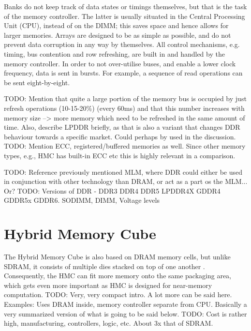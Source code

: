 Banks do not keep track of data states or timings themselves, but that is the task of the memory controller. The latter is usually situated in the Central Processing Unit (CPU), instead of on the DIMM; this saves space and hence allows for larger memories. Arrays are designed to be as simple as possible, and do not prevent data corruption in any way by themselves. All control mechanisms, e.g. timing, bus contention and row refreshing, are built in and handled by the memory controller. In order to not over-utilise buses, and enable a lower clock frequency, data is sent in bursts. For example, a sequence of read operations can be sent eight-by-eight. 

TODO: Mention that quite a large portion of the memory bus is occupied by just refresh operations (10-15-20\%) (every 60ms) and that this number increases with memory size --> more memory which need to be refreshed in the same amount of time. Also, describe LPDDR briefly, as that is also a variant that changes DDR behaviour towards a specific market. Could perhaps by used in the discussion.
TODO: Mention ECC, registered/buffered memories as well. Since other memory types, e.g., HMC has built-in ECC etc this is highly relevant in a comparison. 
\bigskip

TODO: Reference previously mentioned MLM, where DDR could either be used in conjunction with other technology than DRAM, or act as a part os the MLM... Or?
TODO: Versions of DDR - DDR3 DDR4 DDR5 LPDDR4X GDDR4 GDDR5x GDDR6. SODIMM, DIMM, Voltage levels

\section{Hybrid Memory Cube}
The Hybrid Memory Cube is also based on DRAM memory cells, but unlike SDRAM, it consists of multiple dies stacked on top of one another \cite{hybrid2013hybrid}. Consequently, the HMC can fit more memory onto the same packaging area, which gets even more important as HMC is designed for near-memory computation. TODO: Very, very compact intro. A lot more can be said here. Examples: Uses DRAM inside, memory controller separate from CPU. Basically a very summarized version of what is going to be said below.
TODO: Cost is rather high, manufacturing, controllers, logic, etc. About 3x that of SDRAM.

